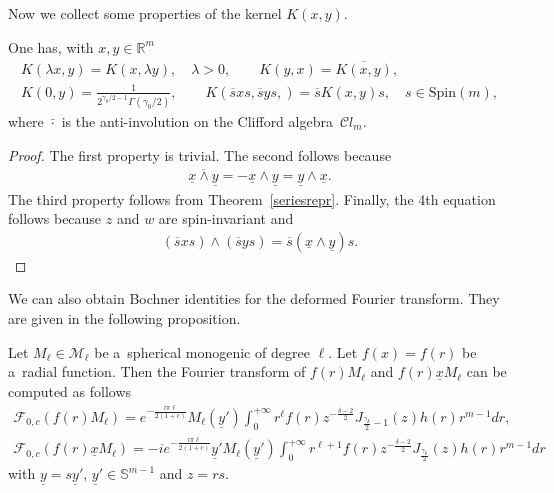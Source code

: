 \documentclass[pdftex]{sigma}
\numberwithin{equation}{section}
\numberwithin{theorem}{section}
\numberwithin{proposition}{section}
\numberwithin{lemma}{section}
\numberwithin{corollary}{section}
\numberwithin{definition}{section}
\numberwithin{example}{section}
\numberwithin{remark}{section}
\numberwithin{note}{section}
\theoremstyle{remark}
\newcommand{\mR}{\mathbb{R}}
\newcommand{\mS}{\mathbb{S}}
\newcommand{\cM}{\mathcal{M}}
\newcommand{\cF}{\mathcal{F}}
\newcommand{\cC}{\mathcal{C}}
\newcommand{\ux}{\underline{x}}
\newcommand{\uy}{\underline{y}}
\def\l{{\lambda}}
\begin{document}
Now we collect some properties of the kernel $K(x,y)$.

\begin{proposition}
One has, with $x,y\in\mR^{m}$
\begin{gather*}
K(\l x,y) = K(x, \l y), \quad \l > 0,\qquad
K(y,x) = \overline{K(x,y)},\\
K(0,y)  = \frac{1}{2^{\gamma_{0}/2-1}\Gamma(\gamma_{0}/2)},\qquad
K(\overline{s} x s,\overline{s} y s,) = \overline{s} K(x,y) s, \quad s \in \mathrm{Spin}(m),
\end{gather*}
where $\bar{\cdot}$ is the anti-involution on the Clifford algebra~$\cC l_{m}$.
\end{proposition}

\begin{proof}
The f\/irst property is trivial.
The second follows because
\begin{gather*}
\overline{\ux\wedge\uy}=-\ux\wedge\uy=\uy\wedge\ux.
\end{gather*}
The third property follows from Theorem~\ref{seriesrepr}.
Finally, the 4th equation follows because $z$ and $w$ are spin-invariant and
\begin{gather*}
\left(\overline{s}x s\right)\wedge\left(\overline{s}y s\right)=\overline{s}\left(\ux
\wedge\uy\right)s.
\tag*{\qed}
\end{gather*}
\renewcommand{\qed}{}
\end{proof}

We can also obtain Bochner identities for the deformed Fourier transform.
They are given in the following proposition.

\begin{proposition}\label{Bochner}
Let $M_{\ell}\in\cM_{\ell}$ be a~spherical monogenic of degree $\ell$.
Let $f(x)=f(r)$ be a~radial function.
Then the Fourier transform of $f(r)M_{\ell}$ and $f(r)\ux M_{\ell}$ can be computed as follows
\begin{gather*}
\cF_{0, c}(f(r) M_{\ell}) = e^{-\frac{i \pi \ell}{2(1+c)}} M_{{\ell}}(\uy') \int_{0}^{+\infty}
r^{\ell} f(r) z^{-\frac{\delta-2}{2}} J_{\frac{\gamma_{k}}{2} -1}(z) h(r) r^{m-1} dr,\\
\cF_{0, c} (f(r) \ux M_{\ell}) = -i e^{-\frac{i \pi \ell}{2(1+c)}} \uy' M_{{\ell}}(\uy')
\int_{0}^{+\infty} r^{\ell+1} f(r) z^{-\frac{\delta-2}{2}} J_{\frac{\gamma_{k}}{2} }(z)
h(r)r^{m-1} dr
\end{gather*}
with $\uy=s\uy'$, $\uy'\in\mS^{m-1}$ and $z=r s$.
\end{proposition}
\end{document}
